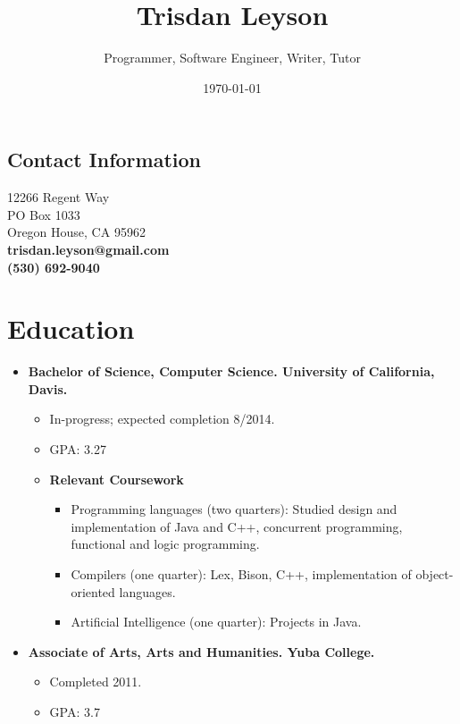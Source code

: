 \documentclass[12pt]{article}
\title{Trisdan Leyson}
\author{Programmer, Software Engineer, Writer, Tutor}
\date{\today}
\begin{document}
\maketitle

\begin{center}
\section*{Contact Information}
\label{sec-1}
12266 Regent Way\\
PO Box 1033\\
Oregon House, CA 95962\\
\textbf{trisdan.leyson@gmail.com}\\
\textbf{(530) 692-9040}\\
\end{center}
\section*{Education}
\label{sec-2}

\begin{itemize}
\item \textbf{Bachelor of Science, Computer Science. University of California, Davis.}
\begin{itemize}
\item In-progress; expected completion 8/2014.
\item GPA: 3.27
\item \textbf{Relevant Coursework}
\begin{itemize}
\item Programming languages (two quarters): Studied design 
          and implementation of Java and C++, concurrent programming,
          functional and logic programming.
\item Compilers (one quarter): Lex, Bison, C++, implementation of
          object-oriented languages.
\item Artificial Intelligence (one quarter): Projects in Java.
\end{itemize}
\end{itemize}
\item \textbf{Associate of Arts, Arts and Humanities. Yuba College.}
\begin{itemize}
\item Completed 2011.
\item GPA: 3.7
\end{itemize}
\end{itemize}
\end{document}
